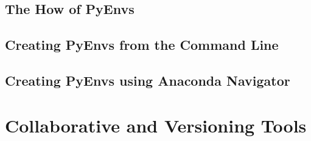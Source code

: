 \documentclass[aspectratio=1610]{beamer}
\begin{document}
\subsection{The How of PyEnvs}

\subsection{Creating PyEnvs from the Command Line}

\begin{frame}[c]{}	
\end{frame}

\subsection{Creating PyEnvs using Anaconda Navigator}

\begin{frame}[c]{}	
\end{frame}


\section{Collaborative and Versioning Tools}
\end{document}
